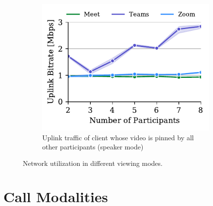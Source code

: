 \begin{figure}[tb!]
\begin{subfigure}[t]{.33\textwidth}
    \label{fig:gallery-send}
\end{subfigure}
\hfill
\begin{subfigure}[t]{.33\textwidth}
  \centering
   \captionsetup{width=.9\linewidth}
    \includegraphics[width=1\textwidth,keepaspectratio]{../figures/modality/speaker_send.pdf}
    \caption{Uplink traffic of client whose video is pinned by all other participants (speaker mode)}
    \label{fig:speaker-send}
\end{subfigure}
\caption{Network utilization in different viewing modes.}
\label{fig:viewing-mode}
\end{figure}




\section{Call Modalities}\label{sec:usage_modality}

